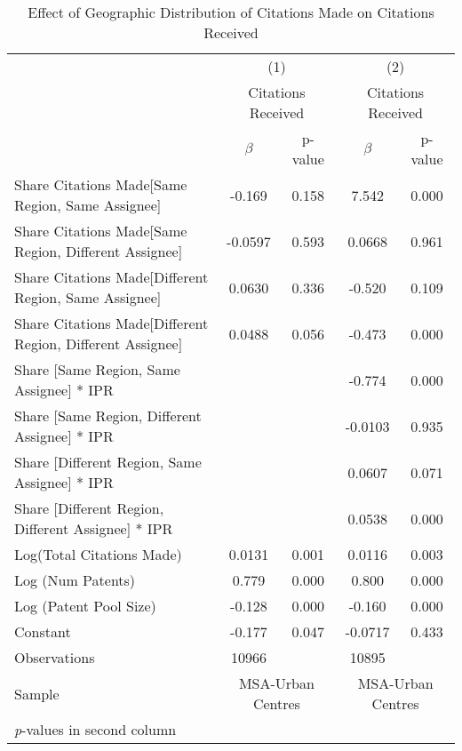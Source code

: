 {
\begin{longtable}{l*{2}{cc}}
\caption{Effect of Geographic Distribution of Citations Made on Citations Received \label{model13}}\\
\hline\hline\endfirsthead\hline\endhead\hline\endfoot\endlastfoot
                &\multicolumn{2}{c}{(1)}&\multicolumn{2}{c}{(2)}\\
                &\multicolumn{2}{c}{Citations Received}&\multicolumn{2}{c}{Citations Received}\\
                &$\beta$&p-value&$\beta$&p-value\\
\hline
Share Citations Made[Same Region, Same Assignee]&   -0.169&    0.158&    7.542&    0.000\\
Share Citations Made[Same Region, Different Assignee]&  -0.0597&    0.593&   0.0668&    0.961\\
Share Citations Made[Different Region, Same Assignee]&   0.0630&    0.336&   -0.520&    0.109\\
Share Citations Made[Different Region, Different Assignee]&   0.0488&    0.056&   -0.473&    0.000\\
Share [Same Region, Same Assignee] * IPR&         &         &   -0.774&    0.000\\
Share [Same Region, Different Assignee] * IPR&         &         &  -0.0103&    0.935\\
Share [Different Region, Same Assignee] * IPR&         &         &   0.0607&    0.071\\
Share [Different Region, Different Assignee] * IPR&         &         &   0.0538&    0.000\\
Log(Total Citations Made)&   0.0131&    0.001&   0.0116&    0.003\\
Log (Num Patents)&    0.779&    0.000&    0.800&    0.000\\
Log (Patent Pool Size)&   -0.128&    0.000&   -0.160&    0.000\\
Constant        &   -0.177&    0.047&  -0.0717&    0.433\\
\hline
Observations    &    10966&         &    10895&         \\
Sample          &\multicolumn{2}{c}{MSA-Urban Centres}&\multicolumn{2}{c}{MSA-Urban Centres}         \\
\hline\hline
\multicolumn{5}{l}{\footnotesize \textit{p}-values in second column}\\
\end{longtable}
}
